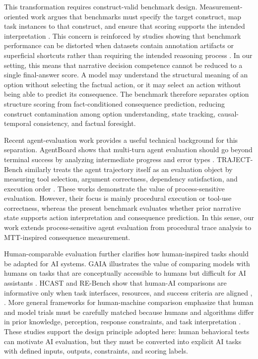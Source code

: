 \documentclass[pdflatex,sn-mathphys-num]{sn-jnl}%
\theoremstyle{thmstyleone}%
\theoremstyle{thmstyletwo}%
\theoremstyle{thmstylethree}%
\begin{document}
This transformation requires construct-valid benchmark design. Measurement-oriented work argues that benchmarks must specify the target construct, map task instances to that construct, and ensure that scoring supports the intended interpretation \cite{bean2025measuring}. This concern is reinforced by studies showing that benchmark performance can be distorted when datasets contain annotation artifacts or superficial shortcuts rather than requiring the intended reasoning process \cite{gururangan2018annotation}. In our setting, this means that narrative decision competence cannot be reduced to a single final-answer score. A model may understand the structural meaning of an option without selecting the factual action, or it may select an action without being able to predict its consequence. The benchmark therefore separates option structure scoring from fact-conditioned consequence prediction, reducing construct contamination among option understanding, state tracking, causal-temporal consistency, and factual foresight.

Recent agent-evaluation work provides a useful technical background for this separation. AgentBoard shows that multi-turn agent evaluation should go beyond terminal success by analyzing intermediate progress and error types \cite{ma2024agentboard}. TRAJECT-Bench similarly treats the agent trajectory itself as an evaluation object by measuring tool selection, argument correctness, dependency satisfaction, and execution order \cite{he2025trajectbencha}. These works demonstrate the value of process-sensitive evaluation. However, their focus is mainly procedural execution or tool-use correctness, whereas the present benchmark evaluates whether prior narrative state supports action interpretation and consequence prediction. In this sense, our work extends process-sensitive agent evaluation from procedural trace analysis to MTT-inspired consequence measurement.

Human-comparable evaluation further clarifies how human-inspired tasks should be adapted for AI systems. GAIA illustrates the value of comparing models with humans on tasks that are conceptually accessible to humans but difficult for AI assistants \cite{mialon2023gaia}. HCAST and RE-Bench show that human-AI comparisons are informative only when task interfaces, resources, and success criteria are aligned \cite{rein2025hcast}, \cite{wijk2024rebench}. More general frameworks for human-machine comparison emphasize that human and model trials must be carefully matched because humans and algorithms differ in prior knowledge, perception, response constraints, and task interpretation \cite{cowley2022framework,lee2022evaluating}. These studies support the design principle adopted here: human behavioral tests can motivate AI evaluation, but they must be converted into explicit AI tasks with defined inputs, outputs, constraints, and scoring labels.
\end{document}
